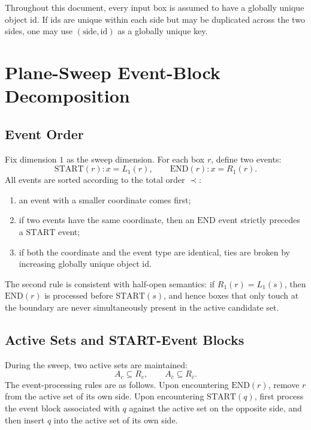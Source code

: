 \documentclass[11pt]{article}
\newcommand{\Rc}{R_c}
\newcommand{\Rbar}{R_{\bar c}}
\newcommand{\Start}{\mathrm{START}}
\newcommand{\End}{\mathrm{END}}
\newcommand{\id}{\mathrm{id}}
\begin{document}
Throughout this document, every input box is assumed to have a globally unique object id. If ids are unique within each side but may be duplicated across the two sides, one may use \((\text{side},\id)\) as a globally unique key.

\section{Plane-Sweep Event-Block Decomposition}

\subsection{Event Order}

Fix dimension \(1\) as the sweep dimension. For each box \(r\), define two events:
\[
 \Start(r):x=L_1(r),\qquad \End(r):x=R_1(r).
\]
All events are sorted according to the total order \(\prec\):
\begin{enumerate}[leftmargin=2em]
  \item an event with a smaller coordinate comes first;
  \item if two events have the same coordinate, then an \(\End\) event strictly precedes a \(\Start\) event;
  \item if both the coordinate and the event type are identical, ties are broken by increasing globally unique object id.
\end{enumerate}
The second rule is consistent with half-open semantics: if \(R_1(r)=L_1(s)\), then \(\End(r)\) is processed before \(\Start(s)\), and hence boxes that only touch at the boundary are never simultaneously present in the active candidate set.

\subsection{Active Sets and START-Event Blocks}

During the sweep, two active sets are maintained:
\[
 A_c\subseteq\Rc,
 \qquad
 A_{\bar c}\subseteq\Rbar.
\]
The event-processing rules are as follows. Upon encountering \(\End(r)\), remove \(r\) from the active set of its own side. Upon encountering \(\Start(q)\), first process the event block associated with \(q\) against the active set on the opposite side, and then insert \(q\) into the active set of its own side.
\end{document}
